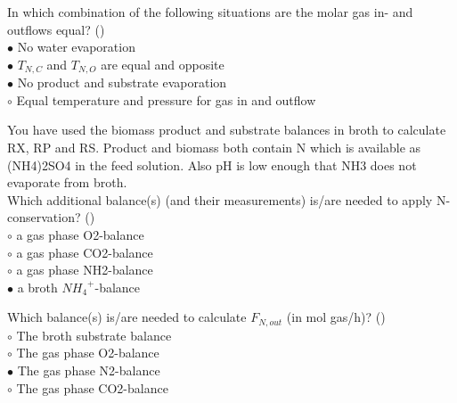\documentclass[]{beamer}
\begin{document}
\begin{frame}[shrink] {}
\addtocounter{answers}{1}
\color{blue}
In which combination of the following situations are the molar gas in- and outflows equal?  ()\\
\color{black}
\setlength{\parindent}{-0.4cm}
{\color{red}$\bullet$}   No water evaporation\\
{\color{red}$\bullet$} $T_{N,C}$ and $T_{N,O}$ are equal and opposite  \\
{\color{red}$\bullet$} No product and substrate evaporation\\
{\color{red}$\circ$} Equal temperature and pressure for gas in and outflow    \\
\end{frame}

\begin{frame}[shrink] {}
\addtocounter{answers}{1}
\color{blue}
You have used the biomass product and substrate balances in broth to calculate RX, RP and RS. Product and biomass both contain N which is available as (NH4)2SO4 in the feed solution. Also pH is low enough that NH3 does not evaporate from broth.\\[0.3em]
Which additional balance(s) (and their measurements) is/are needed to apply N-conservation? ()\\
\color{black}
\setlength{\parindent}{-0.4cm}
{\color{red}$\circ$}   a gas phase O2-balance \\
{\color{red}$\circ$} a gas phase CO2-balance \\
{\color{red}$\circ$} a gas phase NH2-balance \\
{\color{red}$\bullet$} a broth ${NH_4}^+$-balance  \\
\end{frame}

\begin{frame}[shrink] {}
\addtocounter{answers}{1}
\color{blue}
Which balance(s) is/are needed to calculate $F_{N,out}$ (in mol gas/h)?  ()\\
\color{black}
\setlength{\parindent}{-0.4cm}
{\color{red}$\circ$}    The broth substrate balance  \\
{\color{red}$\circ$} The gas phase O2-balance  \\
{\color{red}$\bullet$} The gas phase N2-balance\\
{\color{red}$\circ$} The gas phase CO2-balance  \\
\end{frame}
\end{document}
